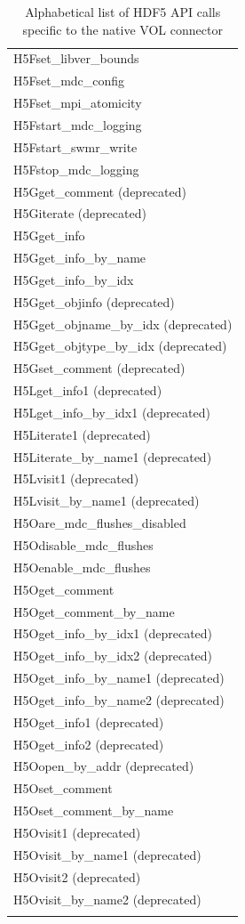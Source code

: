 \begin{longtable}{ |>{\raggedright\arraybackslash}p{\linewidth}| }
    H5Fset\_libver\_bounds \\
    H5Fset\_mdc\_config \\
    H5Fset\_mpi\_atomicity \\
    H5Fstart\_mdc\_logging \\
    H5Fstart\_swmr\_write \\
    H5Fstop\_mdc\_logging \\
    \hline
    H5Gget\_comment (deprecated) \\
    H5Giterate (deprecated) \\
    H5Gget\_info \\
    H5Gget\_info\_by\_name \\
    H5Gget\_info\_by\_idx \\
    H5Gget\_objinfo (deprecated) \\
    H5Gget\_objname\_by\_idx (deprecated) \\
    H5Gget\_objtype\_by\_idx (deprecated) \\
    H5Gset\_comment (deprecated) \\
    \hline
    H5Lget\_info1 (deprecated) \\
    H5Lget\_info\_by\_idx1 (deprecated) \\
    H5Literate1 (deprecated) \\
    H5Literate\_by\_name1 (deprecated) \\
    H5Lvisit1 (deprecated) \\
    H5Lvisit\_by\_name1 (deprecated) \\
    \hline
    H5Oare\_mdc\_flushes\_disabled \\
    H5Odisable\_mdc\_flushes \\
    H5Oenable\_mdc\_flushes \\
    H5Oget\_comment \\
    H5Oget\_comment\_by\_name \\
    H5Oget\_info\_by\_idx1 (deprecated) \\
    H5Oget\_info\_by\_idx2 (deprecated)\\
    H5Oget\_info\_by\_name1 (deprecated) \\
    H5Oget\_info\_by\_name2 (deprecated)\\
    H5Oget\_info1 (deprecated) \\
    H5Oget\_info2 (deprecated) \\
    H5Oopen\_by\_addr (deprecated) \\
    H5Oset\_comment \\
    H5Oset\_comment\_by\_name \\
    H5Ovisit1 (deprecated) \\
    H5Ovisit\_by\_name1 (deprecated) \\
    H5Ovisit2 (deprecated) \\
    H5Ovisit\_by\_name2 (deprecated) \\
    \hline
\caption{Alphabetical list of HDF5 API calls specific to the native VOL connector}
\end{longtable}

